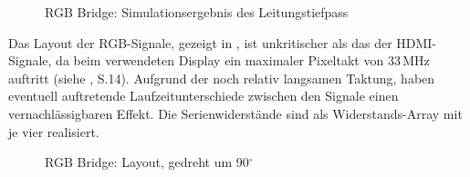 \begin{figure}[htbp]
 			\caption{RGB Bridge: Simulationsergebnis des Leitungstiefpass}
            \label{fig:teilb_tiefpass_mess}
%
\end{figure}
\newpage
Das Layout der RGB-Signale, gezeigt in , ist unkritischer als das der HDMI-Signale, da beim verwendeten Display ein maximaler Pixeltakt von 33\,MHz auftritt (siehe \cite{LG2012}, S.14). Aufgrund der noch relativ langsamen Taktung, haben eventuell auftretende Laufzeitunterschiede zwischen den Signale einen vernachlässigbaren Effekt. Die Serienwiderstände sind als Widerstands-Array mit je vier realisiert.
\begin{figure}[htp]
	\center
 	\caption{RGB Bridge: Layout, gedreht um 90$^{\circ}$} 
    \label{fig:teilb_rgb_bridge_pcb}
\end{figure}

